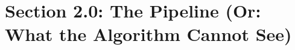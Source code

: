 %

\section*{Section 2.0: The Pipeline (Or: What the Algorithm Cannot See)}

\ifdraft
\lipsum[1-3]
\fi
